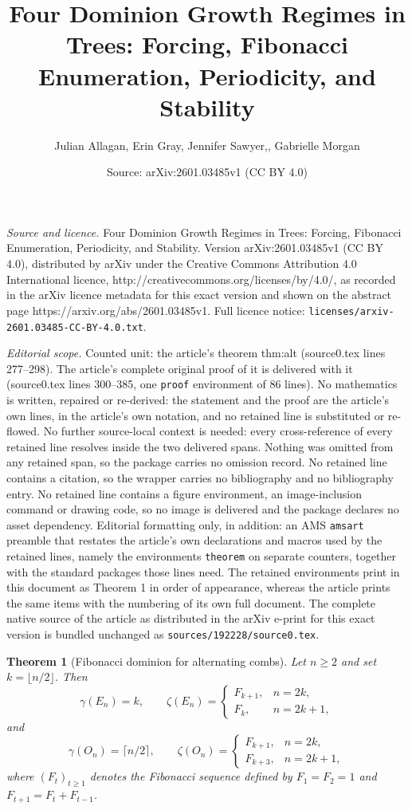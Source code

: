\documentclass[10pt,a4paper]{amsart}
\title{Four Dominion Growth Regimes in Trees: Forcing, Fibonacci Enumeration, Periodicity, and Stability}
\author{Julian Allagan, Erin Gray, Jennifer Sawyer,, Gabrielle Morgan}
\date{Source: arXiv:2601.03485v1 (CC BY 4.0)}
\newtheorem{theorem}{Theorem}
\begin{document}
\maketitle

\noindent\emph{Source and licence.} Four Dominion Growth Regimes in Trees: Forcing, Fibonacci Enumeration, Periodicity, and Stability. Version arXiv:2601.03485v1 (CC BY 4.0), distributed by arXiv under the Creative Commons Attribution 4.0 International licence, http://creativecommons.org/licenses/by/4.0/, as recorded in the arXiv licence metadata for this exact version and shown on the abstract page https://arxiv.org/abs/2601.03485v1. Full licence notice: \texttt{licenses/arxiv-2601.03485-CC-BY-4.0.txt}.\par\smallskip

\noindent\textit{Editorial scope.} Counted unit: the article's theorem thm:alt (source0.tex lines 277--298). The article's complete original proof of it is delivered with it (source0.tex lines 300--385, one \texttt{proof} environment of 86 lines). No mathematics is written, repaired or re-derived: the statement and the proof are the article's own lines, in the article's own notation, and no retained line is substituted or re-flowed.  No further source-local context is needed: every cross-reference of every retained line resolves inside the two delivered spans.  Nothing was omitted from any retained span, so the package carries no omission record.  No retained line contains a citation, so the wrapper carries no bibliography and no bibliography entry.  No retained line contains a figure environment, an image-inclusion command or drawing code, so no image is delivered and the package declares no asset dependency.  Editorial formatting only, in addition: an AMS \texttt{amsart} preamble that restates the article's own declarations and macros used by the retained lines, namely the environments \texttt{theorem} on separate counters, together with the standard packages those lines need.  The retained environments print in this document as Theorem 1 in order of appearance, whereas the article prints the same items with the numbering of its own full document.  The complete native source of the article as distributed in the arXiv e-print for this exact version is bundled unchanged as \texttt{sources/192228/source0.tex}.
\begin{theorem}[Fibonacci dominion for alternating combs]\label{thm:alt}
Let $n\ge 2$ and set $k=\lfloor n/2\rfloor$. Then
\[
\gamma(E_n)=k,\qquad
\zeta(E_n)=
\begin{cases}
F_{k+1},& n=2k,\\
F_k,& n=2k+1,
\end{cases}
\]
and
\[
\gamma(O_n)=\lceil n/2\rceil,\qquad
\zeta(O_n)=
\begin{cases}
F_{k+1},& n=2k,\\
F_{k+3},& n=2k+1,
\end{cases}
\]
where $(F_t)_{t\ge1}$ denotes the Fibonacci sequence defined by $F_1=F_2=1$ and
$F_{t+1}=F_t+F_{t-1}$.
\end{theorem}
\end{document}
